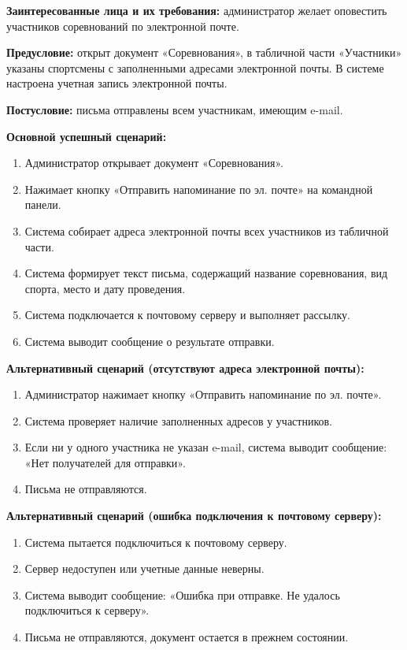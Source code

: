 \textbf{Заинтересованные лица и их требования:} администратор желает оповестить участников соревнований по электронной почте.

\textbf{Предусловие:} открыт документ «Соревнования», в табличной части «Участники» указаны спортсмены с заполненными адресами электронной почты. В системе настроена учетная запись электронной почты.

\textbf{Постусловие:} письма отправлены всем участникам, имеющим e-mail.

\textbf{Основной успешный сценарий:}

\begin{enumerate}
	\item Администратор открывает документ «Соревнования».
	\item Нажимает кнопку «Отправить напоминание по эл. почте» на командной панели.
	\item Система собирает адреса электронной почты всех участников из табличной части.
	\item Система формирует текст письма, содержащий название соревнования, вид спорта, место и дату проведения.
	\item Система подключается к почтовому серверу и выполняет рассылку.
	\item Система выводит сообщение о результате отправки.
\end{enumerate}

\textbf{Альтернативный сценарий (отсутствуют адреса электронной почты):}

\begin{enumerate}
	\item Администратор нажимает кнопку «Отправить напоминание по эл. почте».
	\item Система проверяет наличие заполненных адресов у участников.
	\item Если ни у одного участника не указан e-mail, система выводит сообщение: «Нет получателей для отправки».
	\item Письма не отправляются.
\end{enumerate}

\textbf{Альтернативный сценарий (ошибка подключения к почтовому серверу):}

\begin{enumerate}
	\item Система пытается подключиться к почтовому серверу.
	\item Сервер недоступен или учетные данные неверны.
	\item Система выводит сообщение: «Ошибка при отправке. Не удалось подключиться к серверу».
	\item Письма не отправляются, документ остается в прежнем состоянии.
\end{enumerate}


